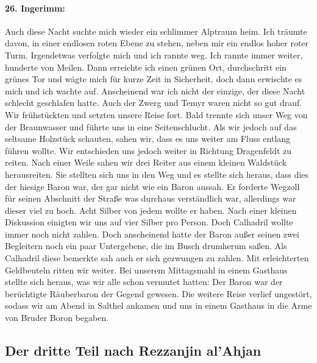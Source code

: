 \documentclass[11pt]{scrreprt}
\begin{document}
\paragraph{26. Ingerimm:}
Auch diese Nacht suchte mich wieder ein schlimmer Alptraum heim. Ich träumte davon, in einer endlosen roten Ebene zu stehen, neben mir ein endlos hoher roter Turm. Irgendetwas verfolgte mich und ich rannte weg. Ich rannte immer weiter, hunderte von Meilen. Dann erreichte ich einen grünen Ort, durchschritt ein grünes Tor und wägte mich für kurze Zeit in Sicherheit, doch dann erwischte es mich und ich wachte auf. Anscheinend war ich nicht der einzige, der diese Nacht schlecht geschlafen hatte. Auch der Zwerg und Temyr waren nicht so gut drauf. Wir frühstückten und setzten unsere Reise fort. Bald trennte sich unser Weg von der Braunwasser und führte uns in eine Seitenschlucht. Als wir jedoch auf das seltsame Holzstück schauten, sahen wir, dass es uns weiter am Fluss entlang führen wollte. Wir entschieden uns jedoch weiter in Richtung Dragenfeldt  zu reiten. Nach einer Weile sahen wir drei Reiter aus einem kleinen Waldstück herausreiten. Sie stellten sich uns in den Weg und es stellte sich heraus, dass dies der hiesige Baron war, der gar nicht wie ein Baron aussah. Er forderte Wegzoll für seinen Abschnitt der Straße was durchaus verständlich war, allerdings war dieser viel zu hoch. Acht Silber von jedem wollte er haben. Nach einer kleinen Diskussion einigten wir uns auf vier Silber pro Person. Doch Calhadril wollte immer noch nicht zahlen. Doch anscheinend hatte der Baron außer seinen zwei Begleitern noch ein paar Untergebene, die im Busch drumherum saßen. Als Calhadril diese bemerkte sah auch er sich gezwungen zu zahlen. Mit erleichterten Geldbeuteln ritten wir weiter. Bei unserem Mittagsmahl in einem Gasthaus stellte sich heraus, was wir alle schon vermutet hatten: Der Baron war der berüchtigte Räuberbaron der Gegend gewesen. Die weitere Reise verlief ungestört, sodass wir am Abend in Salthel ankamen und uns in einem Gasthaus in die Arme von Bruder Boron begaben.

\subsection{Der dritte Teil nach Rezzanjin al’Ahjan}
\end{document}
